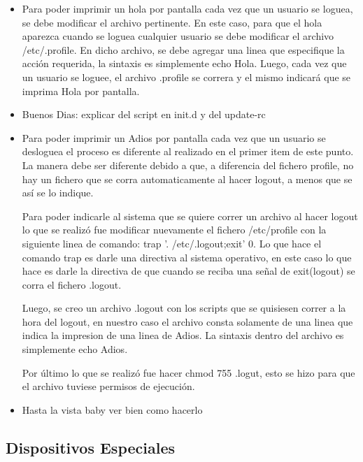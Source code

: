 \documentclass[a4paper, 12pt]{article}
\begin{document}
\begin{itemize}
\item Para poder imprimir un hola por pantalla cada vez que un usuario se loguea, se debe modificar el archivo pertinente. En este caso, para que el hola aparezca cuando se loguea cualquier usuario se debe modificar el archivo /etc/.profile. En dicho archivo, se debe agregar una linea que especifique la acci\'on requerida, la sintaxis es simplemente echo Hola. Luego, cada vez que un usuario se loguee, el archivo .profile se correra y el mismo indicar\'a que se imprima Hola por pantalla.

\item Buenos Dias: explicar del script en init.d y del update-rc


\item Para poder imprimir un Adios por pantalla cada vez que un usuario se desloguea el proceso es diferente al realizado en el primer item de este punto. La manera debe ser diferente debido a que, a diferencia del fichero profile, no hay un fichero que se corra automaticamente al hacer logout, a menos que se as\'i se lo indique. 

Para poder indicarle al sistema que se quiere correr un archivo al hacer logout lo que se realiz\'o fue modificar nuevamente el fichero /etc/profile con la siguiente linea de comando: trap '. /etc/.logout;exit' 0. Lo que hace el comando trap es darle una directiva al sistema operativo, en este caso lo que hace es darle la directiva de que cuando se reciba una se\~{n}al de exit(logout) se corra el fichero .logout.

Luego, se creo un archivo .logout con los scripts que se quisiesen correr a la hora del logout, en nuestro caso el archivo consta solamente de una linea que indica la impresion de una linea de Adios. La sintaxis dentro del archivo es simplemente echo Adios.

Por \'ultimo lo que se realiz\'o fue hacer chmod 755 .logut, esto se hizo para que el archivo tuviese permisos de ejecuci\'on.

\item Hasta la vista baby ver bien como hacerlo


\end{itemize}

\subsection*{Dispositivos Especiales}
\end{document}
